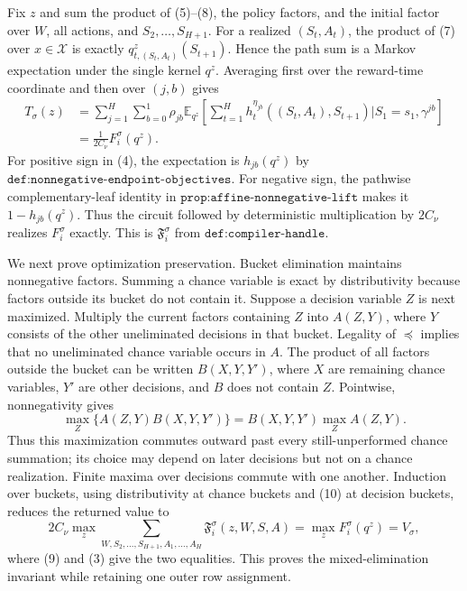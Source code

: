 Fix \(z\) and sum the product of (5)--(8), the policy factors, and the initial factor over \(W\), all actions, and \(S_2,\ldots,S_{H+1}\).  For a realized \((S_t,A_t)\), the product of (7) over \(x\in\mathcal X\) is exactly \(q^z_{t,(S_t,A_t)}(S_{t+1})\).  Hence the path sum is a Markov expectation under the single kernel \(q^z\).  Averaging first over the reward-time coordinate and then over \((j,b)\) gives
\[
 \begin{aligned}
 T_\sigma(z)
 &=\sum_{j=1}^H\sum_{b=0}^1\rho_{jb}
   \mathbb E_{q^z}\!\left[
    \sum_{t=1}^H h_t^{\eta_{jb}}((S_t,A_t),S_{t+1})
    \mathrel{\big|}S_1=s_1,\gamma^{jb}\right]\\
 &=\frac{1}{2C_\nu}F_i^\sigma(q^z).
 \end{aligned}
 \tag{9}
\]
For positive sign in (4), the expectation is \(h_{jb}(q^z)\) by \(\texttt{def:nonnegative-endpoint-objectives}\).  For negative sign, the pathwise complementary-leaf identity in \(\texttt{prop:affine-nonnegative-lift}\) makes it \(1-h_{jb}(q^z)\).  Thus the circuit followed by deterministic multiplication by \(2C_\nu\) realizes \(F_i^\sigma\) exactly.  This is \(\mathfrak F_i^\sigma\) from \(\texttt{def:compiler-handle}\).

We next prove optimization preservation.  Bucket elimination maintains nonnegative factors.  Summing a chance variable is exact by distributivity because factors outside its bucket do not contain it.  Suppose a decision variable \(Z\) is next maximized.  Multiply the current factors containing \(Z\) into \(A(Z,Y)\), where \(Y\) consists of the other uneliminated decisions in that bucket.  Legality of \(\preceq\) implies that no uneliminated chance variable occurs in \(A\).  The product of all factors outside the bucket can be written \(B(X,Y,Y')\), where \(X\) are remaining chance variables, \(Y'\) are other decisions, and \(B\) does not contain \(Z\).  Pointwise, nonnegativity gives
\[
 \max_Z\{A(Z,Y)B(X,Y,Y')\}
 =B(X,Y,Y')\max_ZA(Z,Y).
 \tag{10}
\]
Thus this maximization commutes outward past every still-unperformed chance summation; its choice may depend on later decisions but not on a chance realization.  Finite maxima over decisions commute with one another.  Induction over buckets, using distributivity at chance buckets and (10) at decision buckets, reduces the returned value to
\[
 2C_\nu\max_z\sum_{W,S_2,\ldots,S_{H+1},A_1,\ldots,A_H}
       \mathfrak F_i^\sigma(z,W,S,A)
 =\max_zF_i^\sigma(q^z)=V_\sigma,
 \tag{11}
\]
where (9) and (3) give the two equalities.  This proves the mixed-elimination invariant while retaining one outer row assignment.

